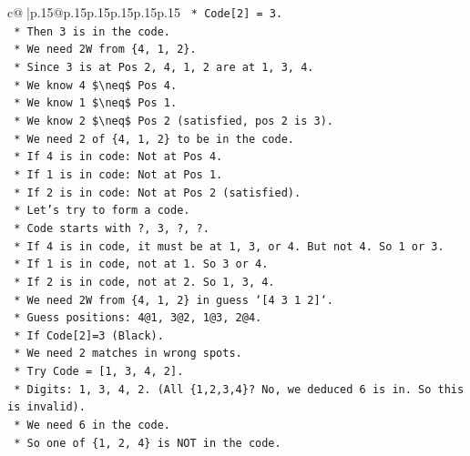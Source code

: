 \documentclass{article}
\begin{document}
{\begin{supertabular}{c@{$\;$}|p{.15\linewidth}@{}p{.15\linewidth}p{.15\linewidth}p{.15\linewidth}p{.15\linewidth}p{.15\linewidth}}
{{{\texttt{                *   Code{[}2{]} = 3.} \\
\texttt{                *   Then 3 is in the code.} \\
\texttt{                *   We need 2W from \{4, 1, 2\}.} \\
\texttt{                *   Since 3 is at Pos 2, 4, 1, 2 are at 1, 3, 4.} \\
\texttt{                *   We know 4 \$\textbackslash{}neq\$ Pos 4.} \\
\texttt{                *   We know 1 \$\textbackslash{}neq\$ Pos 1.} \\
\texttt{                *   We know 2 \$\textbackslash{}neq\$ Pos 2 (satisfied, pos 2 is 3).} \\
\texttt{                *   We need 2 of \{4, 1, 2\} to be in the code.} \\
\texttt{                *   If 4 is in code: Not at Pos 4.} \\
\texttt{                *   If 1 is in code: Not at Pos 1.} \\
\texttt{                *   If 2 is in code: Not at Pos 2 (satisfied).} \\
\texttt{                *   Let's try to form a code.} \\
\texttt{                *   Code starts with ?, 3, ?, ?.} \\
\texttt{                *   If 4 is in code, it must be at 1, 3, or 4. But not 4. So 1 or 3.} \\
\texttt{                *   If 1 is in code, not at 1. So 3 or 4.} \\
\texttt{                *   If 2 is in code, not at 2. So 1, 3, 4.} \\
\texttt{                *   We need 2W from \{4, 1, 2\} in guess `{[}4 3 1 2{]}`.} \\
\texttt{                *   Guess positions: 4@1, 3@2, 1@3, 2@4.} \\
\texttt{                *   If Code{[}2{]}=3 (Black).} \\
\texttt{                *   We need 2 matches in wrong spots.} \\
\texttt{                *   Try Code = {[}1, 3, 4, 2{]}.} \\
\texttt{                    *   Digits: 1, 3, 4, 2. (All \{1,2,3,4\}? No, we deduced 6 is in. So this is invalid).} \\
\texttt{                    *   We need 6 in the code.} \\
\texttt{                    *   So one of \{1, 2, 4\} is NOT in the code.} \\
}}}
\end{supertabular}}
\end{document}
